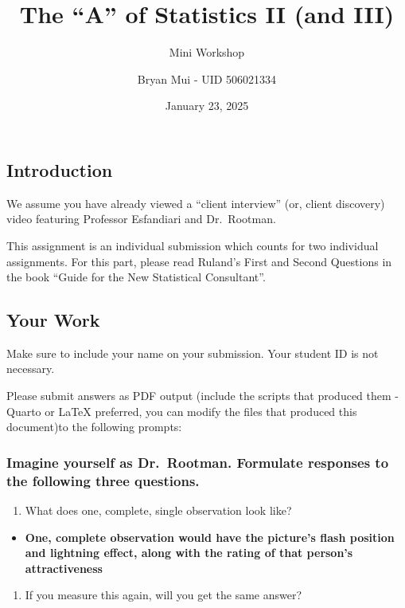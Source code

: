 \documentclass[
  letterpaper,
  DIV=11,
  numbers=noendperiod]{scrartcl}
\title{The ``A'' of Statistics II (and III)}
\subtitle{Mini Workshop}
\author{Bryan Mui - UID 506021334}
\date{January 23, 2025}
\providecommand{\tightlist}{%
  \setlength{\itemsep}{0pt}\setlength{\parskip}{0pt}}\usepackage{longtable,booktabs,array}
\begin{document}
\maketitle


\subsection{Introduction}\label{introduction}

We assume you have already viewed a ``client interview'' (or, client
discovery) video featuring Professor Esfandiari and Dr.~Rootman.

This assignment is an individual submission which counts for two
individual assignments. For this part, please read Ruland's First and
Second Questions in the book ``Guide for the New Statistical
Consultant''.

\subsection{Your Work}\label{your-work}

Make sure to include your name on your submission. Your student ID is
not necessary.

Please submit answers as PDF output (include the scripts that produced
them - Quarto or LaTeX preferred, you can modify the files that produced
this document)to the following prompts:

\subsubsection{Imagine yourself as Dr.~Rootman. Formulate responses to
the following three
questions.}\label{imagine-yourself-as-dr.-rootman.-formulate-responses-to-the-following-three-questions.}

\begin{enumerate}
\def\labelenumi{\arabic{enumi}.}
\tightlist
\item
  What does one, complete, single observation look like?
\end{enumerate}

\begin{itemize}
\tightlist
\item
  \textbf{One, complete observation would have the picture's flash
  position and lightning effect, along with the rating of that person's
  attractiveness}
\end{itemize}

\begin{enumerate}
\def\labelenumi{\arabic{enumi}.}
\setcounter{enumi}{1}
\tightlist
\item
  If you measure this again, will you get the same answer?\\
\end{enumerate}
\end{document}
